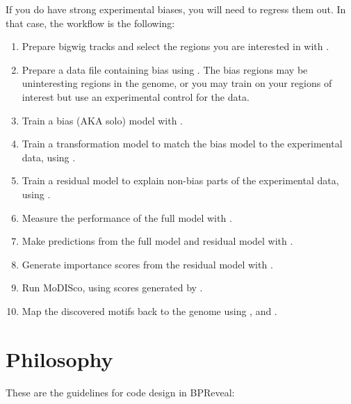 \documentclass{article}
\begin{document}
If you do have strong experimental biases, you will need to regress them out.
In that case, the workflow is the following:

\begin{enumerate}
    \item Prepare bigwig tracks and select the regions you are interested in
        with .
    \item Prepare a data file containing bias using
        . The bias regions may be uninteresting
        regions in the genome, or you may train on your regions of interest but
        use an experimental control for the data.
    \item Train a bias (AKA solo) model with .
    \item Train a transformation model to match the bias model to the
        experimental data, using .
    \item Train a residual model to explain non-bias parts of the experimental
        data, using .
    \item Measure the performance of the full model with .
    \item Make predictions from the full model and residual model with
        .
    \item Generate importance scores from the residual model with
        .
    \item Run MoDISco, using scores generated by .
    \item Map the discovered motifs back to the genome using
        ,  and
        .
\end{enumerate}

\newpage

\section{Philosophy}

These are the guidelines for code design in BPReveal:
\end{document}
